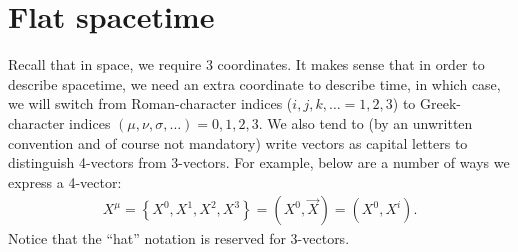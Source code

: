 \documentclass{book}
\theoremstyle{definition}
\begin{document}
\newpage

\chapter{Flat spacetime}
Recall that in space, we require 3 coordinates. It makes sense that in order to describe spacetime, we need an extra coordinate to describe time, in which case, we will switch from Roman-character indices ($i,j,k,\dots = 1,2,3$) to Greek-character indices $(\mu, \nu, \sigma, \dots) = 0,1,2,3$. We also tend to (by an unwritten convention and of course not mandatory) write vectors as capital letters to distinguish 4-vectors from 3-vectors. For example, below are a number of ways we express a 4-vector:
\begin{align*}
X^\mu = \left\{ X^0, X^1, X^2, X^3\right\} = \left( X^0, \vec{X} \right)  = \left( X^0, X^i\right) .
\end{align*}   
Notice that the ``hat'' notation is reserved for 3-vectors. 
\end{document}
